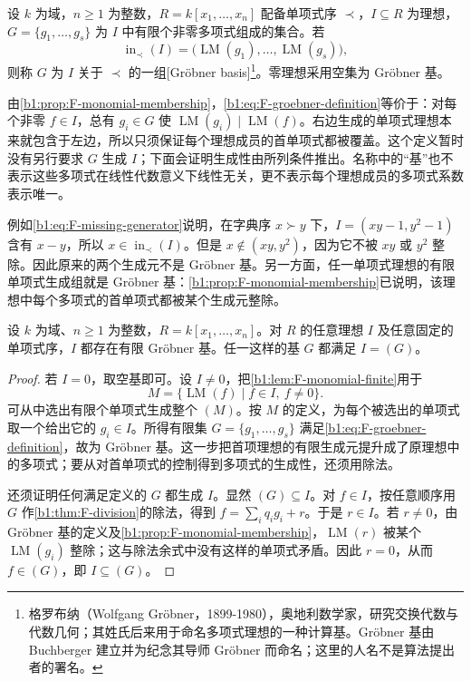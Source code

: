 \begin{samepage}
	\begin{definition}\label{b1:def:F-groebner-basis}
		设 \(k\) 为域，\(n\geq1\) 为整数，\(R=k[x_1,\ldots,x_n]\) 配备单项式序 \(\prec\)，\(I\subseteq R\) 为理想，\(G=\{g_1,\ldots,g_s\}\) 为 \(I\) 中有限个非零多项式组成的集合。若
		\begin{equation}\label{b1:eq:F-groebner-definition}
			\operatorname{in}_{\prec}(I) =\bigl(\operatorname{LM}(g_1),\ldots,\operatorname{LM}(g_s)\bigr),
		\end{equation}
		则称 \(G\) 为 \(I\) 关于 \(\prec\) 的一组[Gröbner basis]\footnote{格罗布纳（Wolfgang Gröbner，1899-1980），奥地利数学家，研究交换代数与代数几何；其姓氏后来用于命名多项式理想的一种计算基。Gröbner 基由 Buchberger 建立并为纪念其导师 Gröbner 而命名；这里的人名不是算法提出者的署名。}。零理想采用空集为 Gröbner 基。
	\end{definition}
\end{samepage}

由\cref{b1:prop:F-monomial-membership}，\eqref{b1:eq:F-groebner-definition}等价于：对每个非零 \(f\in I\)，总有 \(g_i\in G\) 使 \(\operatorname{LM}(g_i)\mid\operatorname{LM}(f)\)。右边生成的单项式理想本来就包含于左边，所以只须保证每个理想成员的首单项式都被覆盖。这个定义暂时没有另行要求 \(G\) 生成 \(I\)；下面会证明生成性由所列条件推出。名称中的“基”也不表示这些多项式在线性代数意义下线性无关，更不表示每个理想成员的多项式系数表示唯一。

\ProseParagraphBreak
例如\eqref{b1:eq:F-missing-generator}说明，在字典序 \(x\succ y\) 下，\(I=(xy-1,y^2-1)\) 含有 \(x-y\)，所以 \(x\in\operatorname{in}_{\prec}(I)\)。但是 \(x\notin(xy,y^2)\)，因为它不被 \(xy\) 或 \(y^2\) 整除。因此原来的两个生成元不是 Gröbner 基。另一方面，任一单项式理想的有限单项式生成组就是 Gröbner 基：\cref{b1:prop:F-monomial-membership}已说明，该理想中每个多项式的首单项式都被某个生成元整除。

\begin{theorem}\label{b1:thm:F-groebner-existence}
	设 \(k\) 为域、\(n\geq1\) 为整数，\(R=k[x_1,\ldots,x_n]\)。对 \(R\) 的任意理想 \(I\) 及任意固定的单项式序，\(I\) 都存在有限 Gröbner 基。任一这样的基 \(G\) 都满足 \(I=(G)\)。
\end{theorem}
\begin{proof}
	若 \(I=0\)，取空基即可。设 \(I\ne0\)，把\cref{b1:lem:F-monomial-finite}用于
	\[
		M=\bigl\{\operatorname{LM}(f)\mid f\in I,\ f\ne0\bigr\}.
	\]
	可从中选出有限个单项式生成整个 \((M)\)。按 \(M\) 的定义，为每个被选出的单项式取一个给出它的 \(g_i\in I\)。所得有限集 \(G=\{g_1,\ldots,g_s\}\) 满足\eqref{b1:eq:F-groebner-definition}，故为 Gröbner 基。这一步把首项理想的有限生成元提升成了原理想中的多项式；要从对首单项式的控制得到多项式的生成性，还须用除法。

	还须证明任何满足定义的 \(G\) 都生成 \(I\)。显然 \((G)\subseteq I\)。对 \(f\in I\)，按任意顺序用 \(G\) 作\cref{b1:thm:F-division}的除法，得到 \(f=\sum_iq_i g_i+r\)。于是 \(r\in I\)。若 \(r\ne0\)，由 Gröbner 基的定义及\cref{b1:prop:F-monomial-membership}，\(\operatorname{LM}(r)\) 被某个 \(\operatorname{LM}(g_i)\) 整除；这与除法余式中没有这样的单项式矛盾。因此 \(r=0\)，从而 \(f\in(G)\)，即 \(I\subseteq(G)\)。
\end{proof}

